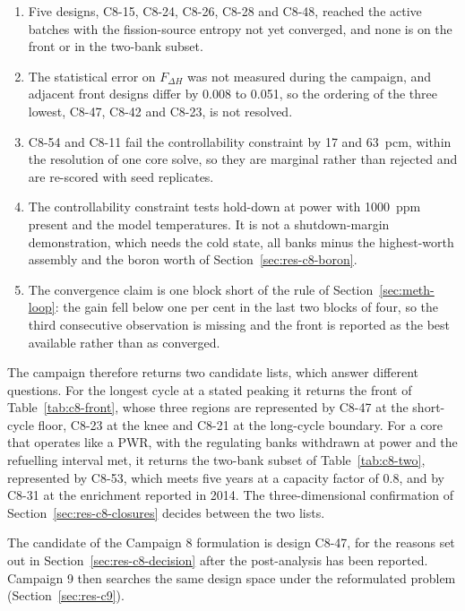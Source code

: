 \begin{enumerate}
  \item Five designs, C8-15, C8-24, C8-26, C8-28 and C8-48, reached the
        active batches with the fission-source entropy not yet
        converged, and none is on the front or in the two-bank subset.

  \item The statistical error on $F_{\Delta H}$ was not measured during
        the campaign, and adjacent front designs differ by 0.008 to
        0.051, so the ordering of the three lowest, C8-47, C8-42 and
        C8-23, is not resolved.

  \item C8-54 and C8-11 fail the controllability constraint by 17 and
        \SI{63}{pcm}, within the resolution of one core solve, so they
        are marginal rather than rejected and are re-scored with seed
        replicates.

  \item The controllability constraint tests hold-down at power with
        \SI{1000}{ppm} present and the model temperatures. It is not a
        shutdown-margin demonstration, which needs the cold state, all
        banks minus the highest-worth assembly and the boron worth of
        Section~\ref{sec:res-c8-boron}.

  \item The convergence claim is one block short of the rule of
        Section~\ref{sec:meth-loop}: the gain fell below one per cent
        in the last two blocks of four, so the third consecutive
        observation is missing and the front is reported as the best
        available rather than as converged.
\end{enumerate}

The campaign therefore returns two candidate lists, which answer
different questions. For the longest cycle at a stated peaking it
returns the front of Table~\ref{tab:c8-front}, whose three regions are
represented by C8-47 at the short-cycle floor, C8-23 at the knee and
C8-21 at the long-cycle boundary. For a core that operates like a
PWR, with the regulating banks withdrawn at power
and the refuelling interval met, it returns the two-bank subset of
Table~\ref{tab:c8-two}, represented by C8-53, which meets five years at
a capacity factor of 0.8, and by C8-31 at the enrichment reported in
2014. The three-dimensional confirmation of
Section~\ref{sec:res-c8-closures} decides between the two lists.

The candidate of the Campaign 8 formulation is design C8-47, for the
reasons set out in Section~\ref{sec:res-c8-decision} after the
post-analysis has been reported. Campaign 9 then searches the same
design space under the reformulated problem (Section~\ref{sec:res-c9}).



